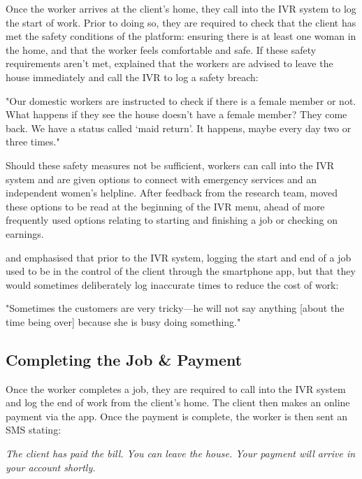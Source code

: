 Once the worker arrives at the client’s home, they call into the IVR system to log the start of work. Prior to doing so, they are required to check that the client has met the safety conditions of the platform: ensuring there is at least one woman in the home, and that the worker feels comfortable and safe. If these safety requirements aren't met, \PC{} explained that the workers are advised to leave the house immediately and call the IVR to log a safety breach: 

\begin{displayquote}
"Our domestic workers are instructed to check if there is a female member or not. What happens if they see the house doesn't have a female member? They come back. We have a status called ‘maid return’. It happens, maybe every day two or three times."
\end{displayquote}

Should these safety measures not be sufficient, workers can call into the IVR system and are given options to connect with emergency services and an independent women's helpline. After feedback from the research team, \PC{} moved these options to be read at the beginning of the IVR menu, ahead of more frequently used options relating to starting and finishing a job or checking on earnings. 

\PC{} and \NGO{} emphasised that prior to the IVR system, logging the start and end of a job used to be in the control of the client through the smartphone app, but that they would sometimes deliberately log inaccurate times to reduce the cost of work:

\begin{displayquote}
"Sometimes the customers are very tricky---he will not say anything [about the time being over] because she is busy doing something."
\end{displayquote}

\subsection{Completing the Job \& Payment}

Once the worker completes a job, they are required to call into the IVR system and log the end of work from the client’s home. The client then makes an online payment via the \PC{} app. Once the payment is complete, the worker is then sent an SMS stating:

\begin{displayquote}
\textit{The client has paid the bill. You can leave the house. Your payment will arrive in your account shortly.}
\end{displayquote}

